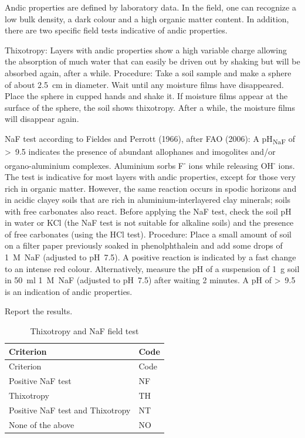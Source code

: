 \documentclass[
  letterpaper,
  DIV=11,
  numbers=noendperiod]{scrreprt}
\begin{document}
Andic properties are defined by laboratory data. In the field, one can
recognize a low bulk density, a dark colour and a high organic matter
content. In addition, there are two specific field tests indicative of
andic properties.

Thixotropy: Layers with andic properties show a high variable charge
allowing the absorption of much water that can easily be driven out by
shaking but will be absorbed again, after a while. Procedure: Take a
soil sample and make a sphere of about 2.5~cm in diameter. Wait until
any moisture films have disappeared. Place the sphere in cupped hands
and shake it. If moisture films appear at the surface of the sphere, the
soil shows thixotropy. After a while, the moisture films will disappear
again.

NaF test according to Fieldes and Perrott (1966), after FAO (2006): A
pH\textsubscript{NaF} of \textgreater~9.5 indicates the presence of
abundant allophanes and imogolites and/or organo-aluminium complexes.
Aluminium sorbs F\textsuperscript{-} ions while releasing
OH\textsuperscript{-} ions. The test is indicative for most layers with
andic properties, except for those very rich in organic matter. However,
the same reaction occurs in spodic horizons and in acidic clayey soils
that are rich in aluminium-interlayered clay minerals; soils with free
carbonates also react. Before applying the NaF test, check the soil pH
in water or KCl (the NaF test is not suitable for alkaline soils) and
the presence of free carbonates (using the HCl test). Procedure: Place a
small amount of soil on a filter paper previously soaked in
phenolphthalein and add some drops of 1~M~NaF (adjusted to pH~7.5). A
positive reaction is indicated by a fast change to an intense red
colour. Alternatively, measure the pH of a suspension of 1~g soil in
50~ml 1~M~NaF (adjusted to pH~7.5) after waiting 2 minutes. A pH of
\textgreater~9.5 is an indication of andic properties.

Report the results.

\begin{longtable}[]{@{}ll@{}}
\caption{Thixotropy and NaF field test}\tabularnewline
\toprule()
Criterion & Code \\
\midrule()
\endfirsthead
\toprule()
Criterion & Code \\
\midrule()
\endhead
Positive NaF test & NF \\
Thixotropy & TH \\
Positive NaF test and Thixotropy & NT \\
None of the above & NO \\
\bottomrule()
\end{longtable}
\end{document}

